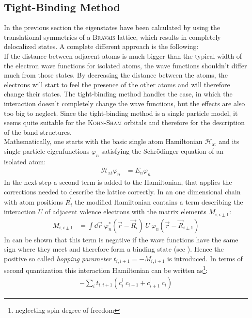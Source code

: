 \subsection{Tight-Binding Method}
In the previous section the eigenstates have been calculated by using the translational symmetries of a \textsc{Bravais} lattice, which results in completely delocalized states. A complete different approach is the following:\\
If the distance between adjacent atoms is much bigger than the typical width of the electron wave functions for isolated atoms, the wave functions shouldn't differ much from those states. By decreasing the distance between the atoms, the electrons will start to feel the presence of the other atoms and will therefore change their states. The tight-binding method handles the case, in which the interaction doesn't completely change the wave functions, but the effects are also too big to neglect. Since the tight-binding method is a single particle model, it seems quite suitable for the \textsc{Kohn-Sham} orbitals and therefore for the description of the band structures.\\
Mathematically, one starts with the basic single atom Hamiltonian $\mathcal{H}_{\text{at}}$ and its single particle eigenfunctions $\varphi_n$ satisfying the Schrödinger equation of an isolated atom:
\begin{align}
	\mathcal{H}_{\text{at}} \varphi_n &= E_n \varphi_n
\end{align}
In the next step a second term is added to the Hamiltonian, that applies the corrections needed to describe the lattice correctly. In an one dimensional chain with atom positions $\vec{R}_i$ the modified Hamiltonian contains a term describing the interaction $U$ of adjacent valence electrons with the matrix elements $M_{i, i\pm1}$:
\begin{align}
	M_{i, i\pm1} &= \int\dd\vec{r}\ \varphi_n^*\left(\vec{r} - \vec{R}_i\right)\ U\ \varphi_n\left(\vec{r}-\vec{R}_{i\pm1}\right) 
\end{align}
In can be shown that this term is negative if the wave functions have the same sign where they meet and therefore form a binding state (see \cite{rohrer}). Hence the positive so called \emph{hopping parameter} $t_{i, i\pm 1} = - M_{i, i\pm 1}$ is introduced. In terms of second quantization this interaction Hamiltonian can be written as\footnote{neglecting spin degree of freedom}:
\begin{align}
	- \sum_i t_{i, i+1} \left(c_i^\dagger\  c_{i+1} + c_{i+1}^\dagger\  c_i\right)
\end{align}
